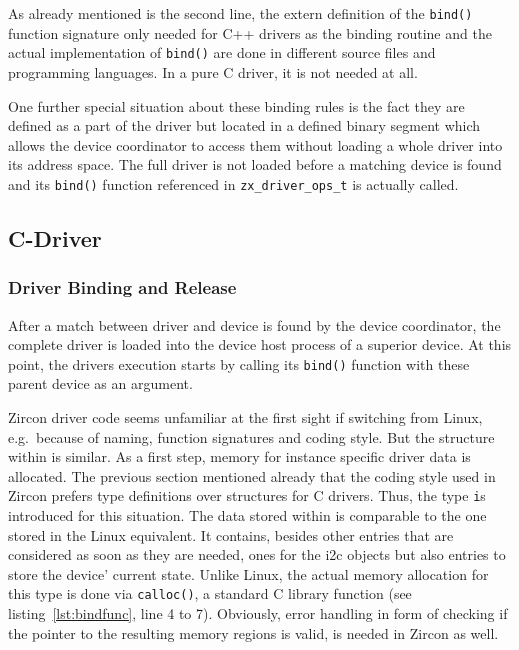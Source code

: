 As already mentioned is the second line, the extern definition of the \texttt{bind()} function signature only needed for C++ drivers as the binding routine and the actual implementation of  \texttt{bind()} are done in different source files and programming languages.
In a pure C driver, it is not needed at all.

One further special situation about these binding rules is the fact they are defined as a part of the driver but located in a defined binary segment which allows the device coordinator to access them without loading a whole driver into its address space.
The full driver is not loaded before a matching device is found and its \texttt{bind()} function referenced in \texttt{zx_driver_ops_t} is actually called.

\subsection{C-Driver}

\subsubsection{Driver Binding and Release}\label{sec:zircon:drv:bind}
After a match between driver and device is found by the device coordinator, the complete driver is loaded into the device host process of a superior device.
At this point, the drivers execution starts by calling its \texttt{bind()} function with these parent device as an argument.

Zircon driver code seems unfamiliar at the first sight if switching from Linux, e.g.\ because of naming, function signatures and coding style.
But the structure within is similar.
As a first step, memory for instance specific driver data is allocated.
The previous section mentioned already that the coding style used in Zircon prefers type definitions over structures for C drivers. 
Thus, the type \texttt is introduced for this situation.
The data stored within is comparable to the one stored in the Linux equivalent.
It contains, besides other entries that are considered as soon as they are needed, ones for the \ac{i2c} objects but also entries to store the device' current state.
Unlike Linux, the actual memory allocation for this type is done via \texttt{calloc()}, a standard C library function (see listing~\ref{lst:bindfunc}, line 4 to 7).
Obviously, error handling in form of checking if the pointer to the resulting memory regions is valid, is needed in Zircon as well.

